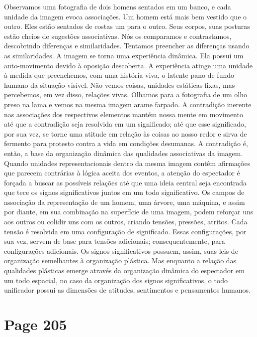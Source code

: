 \documentclass[a4paper]{article}
\begin{document}
Observamos uma fotografia de dois homens sentados em um banco, e cada unidade da imagem evoca associações. Um homem está mais bem vestido que o outro. Eles estão sentados de costas um para o outro. Seus corpos, suas posturas estão cheios de sugestões associativas. Nós os comparamos e contrastamos, descobrindo diferenças e similaridades. Tentamos preencher as diferenças usando as similaridades. A imagem se torna uma experiência dinâmica. Ela possui um auto-movimento devido à oposição descoberta. A experiência atinge uma unidade à medida que preenchemos, com uma história viva, o latente pano de fundo humano da situação visível. Não vemos coisas, unidades estáticas fixas, mas percebemos, em vez disso, relações vivas. Olhamos para a fotografia de um olho preso na lama e vemos na mesma imagem arame farpado. A contradição inerente nas associações dos respectivos elementos mantém nossa mente em movimento até que a contradição seja resolvida em um significado; até que esse significado, por sua vez, se torne uma atitude em relação às coisas ao nosso redor e sirva de fermento para protesto contra a vida em condições desumanas. A contradição é, então, a base da organização dinâmica das qualidades associativas da imagem. Quando unidades representacionais dentro da mesma imagem contêm afirmações que parecem contrárias à lógica aceita dos eventos, a atenção do espectador é forçada a buscar as possíveis relações até que uma ideia central seja encontrada que tece os signos significativos juntos em um todo significativo. Os campos de associação da representação de um homem, uma árvore, uma máquina, e assim por diante, em sua combinação na superfície de uma imagem, podem reforçar uns aos outros ou colidir uns com os outros, criando tensões, pressões, atritos. Cada tensão é resolvida em uma configuração de significado. Essas configurações, por sua vez, servem de base para tensões adicionais; consequentemente, para configurações adicionais. Os signos significativos possuem, assim, suas leis de organização semelhantes à organização plástica. Mas enquanto a relação das qualidades plásticas emerge através da organização dinâmica do espectador em um todo espacial, no caso da organização dos signos significativos, o todo unificador possui as dimensões de atitudes, sentimentos e pensamentos humanos.

\vspace*{\fill}

\newpage
\section*{Page 205}
\end{document}
